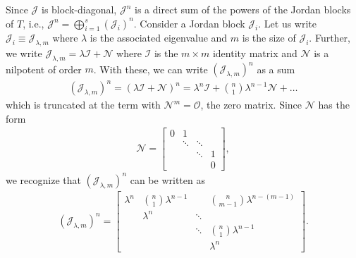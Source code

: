 \documentclass{article}
\begin{document}
Since $\mathcal{J}$ is block-diagonal, $\mathcal{J}^n$ is a direct sum of the powers of the Jordan blocks of $T$, i.e., $\mathcal{J}^n = \bigoplus^s_{i=1} (\mathcal{J}_i)^n$. Consider a Jordan block $\mathcal{J}_i$. Let us write $\mathcal{J}_i \equiv \mathcal{J}_{\lambda,m}$ where $\lambda$ is the associated eigenvalue and $m$ is the size of $\mathcal{J}_i$. Further, we write $\mathcal{J}_{\lambda,m} = \lambda\mathcal{I} + \mathcal{N}$ where $\mathcal{I}$ is the $m\times m$ identity matrix and $\mathcal{N}$ is a nilpotent of order $m$. With these, we can write $(\mathcal{J}_{\lambda,m})^n$ as a sum
\begin{align*}
(\mathcal{J}_{\lambda,m} )^n = (\lambda \mathcal{I} + \mathcal{N})^n = \lambda^n \mathcal{I} + {n \choose 1}\lambda^{n-1}\mathcal{N} + \dots
\end{align*}  
which is truncated at the term with $\mathcal{N}^m = \mathcal{O}$, the zero matrix. Since $\mathcal{N}$ has the form 
\begin{align*}
\mathcal{N} = \begin{bmatrix}
0 & 1 &&\\
& \ddots & \ddots & \\
&&\ddots&1\\
&&&0
\end{bmatrix},
\end{align*}
we recognize that $(\mathcal{J}_{\lambda,m} )^n$ can be written as
\begin{align*}
(\mathcal{J}_{\lambda,m})^n = \begin{bmatrix}
\lambda^n & {n\choose 1}\lambda^{n-1} & & {n\choose {m-1}}\lambda^{n-(m-1)} \\
& \lambda^n & \ddots &\\
&& \ddots & {n\choose 1}\lambda^{n-1}\\
&&&\lambda^{n}
\end{bmatrix}.
\end{align*}
\end{document}
